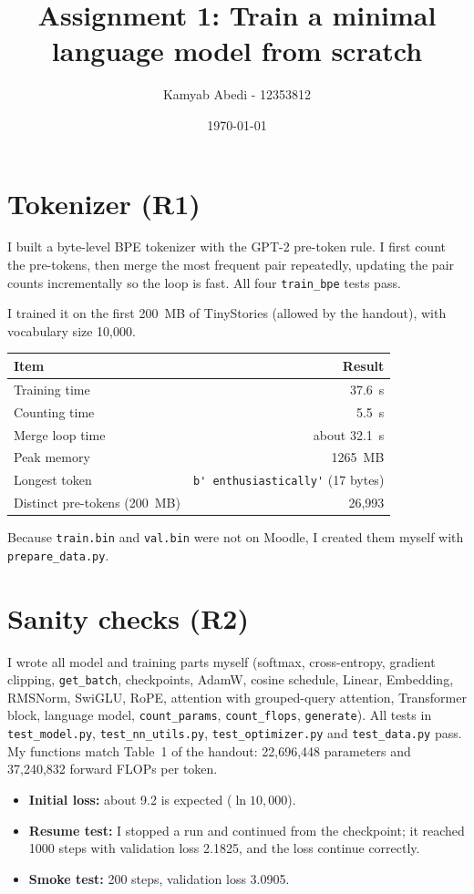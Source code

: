 \documentclass[11pt,a4paper]{article}
\title{Assignment 1: Train a minimal language model from scratch}
\author{Kamyab Abedi - 12353812}
\date{\today}
\begin{document}
\maketitle

\section{Tokenizer (R1)}
I built a byte-level BPE tokenizer with the GPT-2 pre-token rule. I first count the pre-tokens, then merge the most frequent pair repeatedly, updating the pair counts incrementally so the loop is fast. All four \texttt{train\_bpe} tests pass.

I trained it on the first 200~MB of TinyStories (allowed by the handout), with vocabulary size 10,000.

\begin{table}[h]\centering
\begin{tabular}{@{}lr@{}}\toprule
Item & Result \\\midrule
Training time & 37.6~s \\
Counting time & 5.5~s \\
Merge loop time & about 32.1~s \\
Peak memory & 1265~MB \\
Longest token & \verb|b' enthusiastically'| (17 bytes) \\
Distinct pre-tokens (200~MB) & 26,993 \\\bottomrule
\end{tabular}\end{table}


Because \texttt{train.bin} and \texttt{val.bin} were not on Moodle, I created them myself with \texttt{prepare\_data.py}.

\section{Sanity checks (R2)}
I wrote all model and training parts myself (softmax, cross-entropy, gradient clipping, \texttt{get\_batch}, checkpoints, AdamW, cosine schedule, Linear, Embedding, RMSNorm, SwiGLU, RoPE, attention with grouped-query attention, Transformer block, language model, \texttt{count\_params}, \texttt{count\_flops}, \texttt{generate}). All tests in \texttt{test\_model.py}, \texttt{test\_nn\_utils.py}, \texttt{test\_optimizer.py} and \texttt{test\_data.py} pass. My functions match Table~1 of the handout: 22,696,448 parameters and 37,240,832 forward FLOPs per token.
\begin{itemize}\itemsep0pt
\item \textbf{Initial loss:} about 9.2 is expected ($\ln 10{,}000$).
\item \textbf{Resume test:} I stopped a run and continued from the checkpoint; it reached 1000 steps with validation loss 2.1825, and the loss continue correctly.
\item \textbf{Smoke test:} 200 steps, validation loss 3.0905.
\end{itemize}
\end{document}
